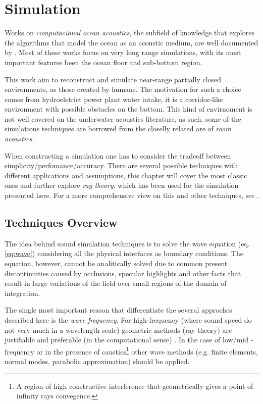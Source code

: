 \section{Simulation}

Works on \textit{computacional ocean
acoustics}, the subfield of knowledge that explores the algorithms that model
the ocean as an acoustic medium, are well documented by
\citet{Etter2013}. Most of these works focus on very long range simulations,
with its most important features been the ocean floor and sub-bottom region.

This work aim to reconstruct and simulate near-range partially closed
environments, as those created by humans. The motivation for such a choice comes
from hydroeletrict power plant water intake, it is a corridor-like environment
with possible obstacles on the bottom. This kind of envirnoment is not well
covered on the underwater acoustics literature, as such, some of the simulations
techniques are borrowed from the closelly related are of \textit{room acoustics}.

When constructing a simulation one has to consider the tradeoff between
simplicity/perfomance/accuracy. There are several possible techniques with
different applications and assumptions, this chapter will cover the most
classic ones and further explore \textit{ray theory}, which has been used for
the simulation presented here. For a more comprehensive view on this and other
techniques, see \citet{LURTON,jensen2011computational}.

\subsection{Techniques Overview}
\label{ss:simuloverview}

The idea behind sound simulation techniques is to solve the wave
equation (eq. \ref{eq:wave}) considering all the physical interfaces as boundary
conditions. The equation, however, cannot be analitically solved due to common
present discontinuities caused by occlusions, specular highlights and other
facts that result in large variations of the field over small regions of the
domain of integration\cite{funkhouser2003survey}.

The single most important reason that differentiate the several approches
described here is the \textit{wave frequency}. For high-frequency (where sound
speed do not very much in a wavelength scale) geometric methods (ray theory) are
justifiable and preferable (in the computational sense) \cite{urick1979}. In the
case of low/mid - frequency or in the presence of caustics\footnote{A region of
high constructive interference that geometrically gives a point of infinity
rays convegence.} other wave methods (e.g. finite elements, normal modes,
parabolic approximation) should be applied.

